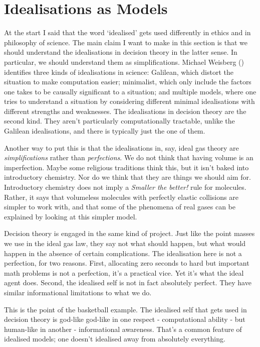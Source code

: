 \documentclass[
  12pt,
  letterpaper,
  DIV=11,
  numbers=noendperiod,
  twoside]{scrartcl}
\begin{document}
\section{Idealisations as Models}\label{idealisations-as-models}

At the start I said that the word `idealised' gets used differently in
ethics and in philosophy of science. The main claim I want to make in
this section is that we should understand the idealisations in decision
theory in the latter sense. In particular, we should understand them as
simplifications. Michael Weisberg ()
identifies three kinds of idealisations in science: Galilean, which
distort the situation to make computation easier; minimalist, which only
include the factors one takes to be causally significant to a situation;
and multiple models, where one tries to understand a situation by
considering different minimal idealisations with different strengths and
weaknesses. The idealisations in decision theory are the second kind.
They aren't particularly computationally tractable, unlike the Galilean
idealisations, and there is typically just the one of them.

Another way to put this is that the idealisations in, say, ideal gas
theory are \emph{simplifications} rather than \emph{perfections}. We do
not think that having volume is an imperfection. Maybe some religious
traditions think this, but it isn't baked into introductory chemistry.
Nor do we think that they are things we should aim for. Introductory
chemistry does not imply a \emph{Smaller the better!} rule for
molecules. Rather, it says that volumeless molecules with perfectly
elastic collisions are simpler to work with, and that some of the
phenomena of real gases can be explained by looking at this simpler
model.

Decision theory is engaged in the same kind of project. Just like the
point masses we use in the ideal gas law, they say not what should
happen, but what would happen in the absence of certain complications.
The idealisation here is not a perfection, for two reasons. First,
allocating zero seconds to hard but important math problems is not a
perfection, it's a practical vice. Yet it's what the ideal agent does.
Second, the idealised self is not in fact absolutely perfect. They have
similar informational limitations to what we do.

This is the point of the basketball example. The idealised self that
gets used in decision theory is god-like god-like in one respect -
computational ability - but human-like in another - informational
awareness. That's a common feature of idealised models; one doesn't
idealised away from absolutely everything.
\end{document}
